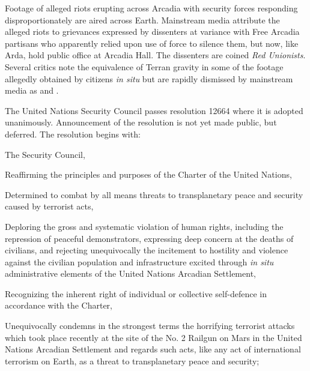 

Footage of alleged riots erupting across Arcadia with security forces responding disproportionately are aired across Earth. Mainstream media attribute the alleged riots to grievances expressed by dissenters at variance with Free Arcadia partisans who apparently relied upon use of force to silence them, but now, like Arda, hold public office at Arcadia Hall. The dissenters are coined {\it Red Unionists}. Several critics note the equivalence of Terran gravity in some of the footage allegedly obtained by citizens {\it in situ} but are rapidly dismissed by mainstream media as  and .
\StopTimelineDate

The United Nations Security Council passes resolution 12664 where it is adopted unanimously. Announcement of the resolution is not yet made public, but deferred. The resolution begins with:

\startTimelineGeneralDocument
The Security Council,

Reaffirming the principles and purposes of the Charter of the United Nations,

Determined to combat by all means threats to transplanetary peace and security caused by terrorist acts,

Deploring the gross and systematic violation of human rights, including the repression of peaceful demonstrators, expressing deep concern at the deaths of civilians, and rejecting unequivocally the incitement to hostility and violence against the civilian population and infrastructure excited through {\it in situ} administrative elements of the United Nations Arcadian Settlement,

Recognizing the inherent right of individual or collective self-defence in accordance with the Charter,

\startitemize[n]
\setupwhitespace[big]
\item Unequivocally condemns in the strongest terms the horrifying terrorist attacks which took place recently at the site of the No. \type{#}2 Railgun on Mars in the United Nations Arcadian Settlement and regards such acts, like any act of international terrorism on Earth, as a threat to transplanetary peace and security;

